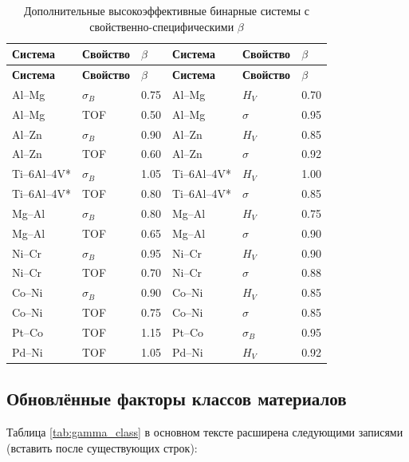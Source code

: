 \documentclass[12pt,a4paper]{article}
\begin{document}
	\begin{longtable}{p{2.2cm} p{2.2cm} p{1.2cm} p{2.2cm} p{2.2cm} p{1.2cm}}
		\caption{Дополнительные высокоэффективные бинарные системы с свойственно-специфическими $\beta$}\label{tab:beta_additional}\\
		\toprule
		\textbf{Система} & \textbf{Свойство} & $\beta$ & \textbf{Система} & \textbf{Свойство} & $\beta$ \\
		\midrule
		\endfirsthead
		\toprule
		\textbf{Система} & \textbf{Свойство} & $\beta$ & \textbf{Система} & \textbf{Свойство} & $\beta$ \\
		\midrule
		\endhead
		Al–Mg & $\sigma_B$ & 0.75 & Al–Mg & $H_V$ & 0.70 \\
		Al–Mg & TOF & 0.50 & Al–Mg & $\sigma$ & 0.95 \\
		Al–Zn & $\sigma_B$ & 0.90 & Al–Zn & $H_V$ & 0.85 \\
		Al–Zn & TOF & 0.60 & Al–Zn & $\sigma$ & 0.92 \\
		Ti–6Al–4V* & $\sigma_B$ & 1.05 & Ti–6Al–4V* & $H_V$ & 1.00 \\
		Ti–6Al–4V* & TOF & 0.80 & Ti–6Al–4V* & $\sigma$ & 0.85 \\
		Mg–Al & $\sigma_B$ & 0.80 & Mg–Al & $H_V$ & 0.75 \\
		Mg–Al & TOF & 0.65 & Mg–Al & $\sigma$ & 0.90 \\
		Ni–Cr & $\sigma_B$ & 0.95 & Ni–Cr & $H_V$ & 0.90 \\
		Ni–Cr & TOF & 0.70 & Ni–Cr & $\sigma$ & 0.88 \\
		Co–Ni & $\sigma_B$ & 0.90 & Co–Ni & $H_V$ & 0.85 \\
		Co–Ni & TOF & 0.75 & Co–Ni & $\sigma$ & 0.85 \\
		Pt–Co & TOF & 1.15 & Pt–Co & $\sigma_B$ & 0.95 \\
		Pd–Ni & TOF & 1.05 & Pd–Ni & $H_V$ & 0.92 \\
		\bottomrule
	\end{longtable}
	\vspace{0.2cm}
	
	\subsection*{Обновлённые факторы классов материалов}
	Таблица \ref{tab:gamma_class} в основном тексте расширена следующими записями (вставить после существующих строк):
	
\end{document}
